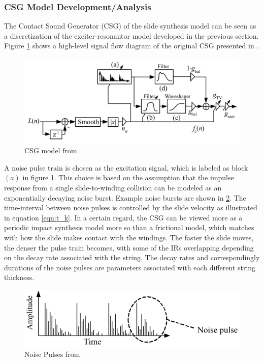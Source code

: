 \documentclass[main.tex]{subfiles}
\begin{document}
\subsubsection{CSG Model Development/Analysis}

The Contact Sound Generator (CSG) of the slide synthesis model can be seen as a discretization of the exciter-resonantor model developed in the previous section. Figure \ref{fig:original_CSG} shows a high-level signal flow diagram of the original CSG presented in . 

\begin{figure}[h]
    \centering
    \includegraphics[scale=.50]{./images/pictures/CSG_original.PNG}
    \caption{CSG model from }
    \label{fig:original_CSG}
\end{figure}

A noise pulse train is chosen as the excitation signal, which is labeled as block $(a)$ in figure \ref{fig:original_CSG}. This choice is based on the assumption that the impulse response from a single slide-to-winding collision can be modeled as an exponentially decaying noise burst. Example noise bursts are shown in \ref{fig:noise_pulses}. The time-interval between noise pulses is controlled by the slide velocity as illustrated in equation \ref{eqn:t_k}. In a certain regard, the CSG can be viewed more as a periodic impact synthesis model more so than a frictional model, which matches with how the slide makes contact with the windings. The faster the slide moves, the denser the pulse train becomes, with some of the IRs overlapping depending on the decay rate associated with the string. The decay rates and correspondingly durations of the noise pulses are parameters associated with each different string thickness.

\begin{figure}[h]
    \centering
    \includegraphics[scale=1]{./images/pictures/noise_pulses.PNG}
    \caption{Noise Pulses from }
    \label{fig:noise_pulses}
\end{figure}
\end{document}
